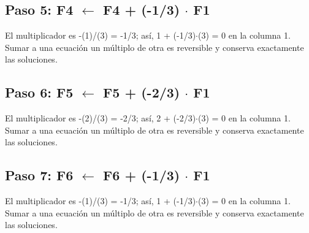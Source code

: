 \documentclass[conference]{IEEEtran}
\begin{document}
\medskip
\subsection*{Paso 5: F4 \(\leftarrow\) F4 + (-1/3) \(\cdot\) F1}
El multiplicador es -(1)/(3) = -1/3; así, 1 + (-1/3)\(\cdot\)(3) = 0 en la columna 1. Sumar a una ecuación un múltiplo de otra es reversible y conserva exactamente las soluciones.


\medskip
\subsection*{Paso 6: F5 \(\leftarrow\) F5 + (-2/3) \(\cdot\) F1}
El multiplicador es -(2)/(3) = -2/3; así, 2 + (-2/3)\(\cdot\)(3) = 0 en la columna 1. Sumar a una ecuación un múltiplo de otra es reversible y conserva exactamente las soluciones.


\medskip
\subsection*{Paso 7: F6 \(\leftarrow\) F6 + (-1/3) \(\cdot\) F1}
El multiplicador es -(1)/(3) = -1/3; así, 1 + (-1/3)\(\cdot\)(3) = 0 en la columna 1. Sumar a una ecuación un múltiplo de otra es reversible y conserva exactamente las soluciones.
\end{document}
